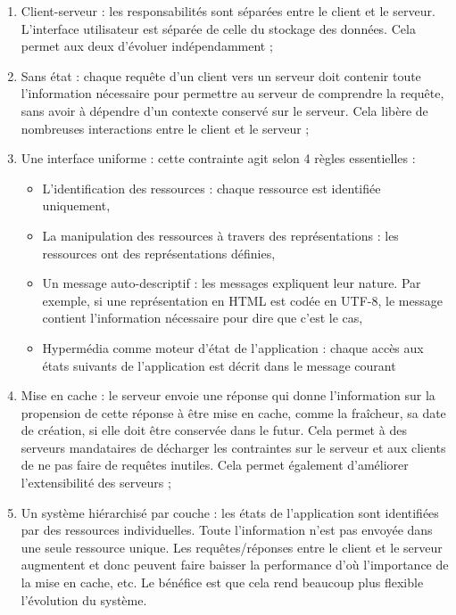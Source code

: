 \documentclass{report}
\begin{document}
\begin{enumerate}
\item Client-serveur : les responsabilités sont séparées entre le client et le serveur. L'interface utilisateur est séparée de
celle du stockage des données. Cela permet aux deux d'évoluer indépendamment ;
\item Sans état : chaque requête d'un client vers un serveur doit contenir toute l'information nécessaire pour permettre 
au serveur de comprendre la requête, sans avoir à dépendre d'un contexte conservé sur le serveur. Cela libère de 
nombreuses interactions entre le client et le serveur ;
\item Une interface uniforme : cette contrainte agit selon 4 règles essentielles :
    \begin{itemize}
    \item L'identification des ressources : chaque ressource est identifiée uniquement,
    \item La manipulation des ressources à travers des représentations : les ressources ont des représentations définies,
    \item Un message auto-descriptif : les messages expliquent leur nature. Par exemple, si une représentation en HTML 
    est codée en UTF-8, le message contient l'information nécessaire pour dire que c'est le cas,
    \item Hypermédia comme moteur d'état de l'application : chaque accès aux états suivants de l'application est décrit 
     dans le message courant
    \end{itemize}
\item Mise en cache : le serveur envoie une réponse qui donne l'information sur la propension de cette réponse à être mise en cache, comme la fraîcheur, sa date de création, si elle doit être conservée dans le futur. Cela permet à des
serveurs mandataires de décharger les contraintes sur le serveur et aux clients de ne pas faire de requêtes inutiles. Cela
permet également d'améliorer l'extensibilité des serveurs ;
\item Un système hiérarchisé par couche : les états de l'application sont identifiées par des ressources individuelles. 
Toute l'information n'est pas envoyée dans une seule ressource unique. Les requêtes/réponses entre le client et le 
serveur augmentent et donc peuvent faire baisser la performance d'où l'importance de la mise en cache, etc. Le bénéfice
est que cela rend beaucoup plus flexible l'évolution du système.
\end{enumerate}
\end{document}
